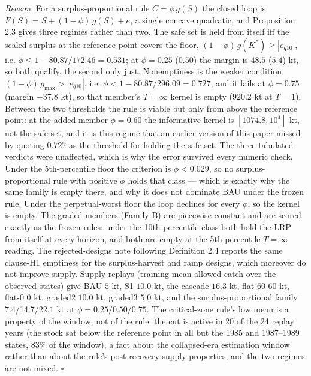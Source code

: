 \emph{Reason.} For a surplus-proportional rule \(C = \phi\, g(S)\) the
closed loop is \(F(S) = S + (1-\phi)\,g(S) + e\), a single concave
quadratic, and Proposition 2.3 gives three regimes rather than two. The
safe set is held from itself iff the scaled surplus at the reference
point covers the floor, \((1-\phi)\,g(K^*) \ge |e_{q10}|\), i.e.
\(\phi \le 1 - 80.87/172.46 = 0.531\); at \(\phi = 0.25\) (\(0.50\))
the margin is \(48.5\) (\(5.4\)) kt, so both qualify, the second only
just. Nonemptiness is the weaker condition
\((1-\phi)\,g_{\max} > |e_{q10}|\), i.e.
\(\phi < 1 - 80.87/296.09 = 0.727\), and it fails at \(\phi = 0.75\)
(margin \(-37.8\) kt), so that member's \(T=\infty\) kernel is empty
(\(920.2\) kt at \(T=1\)). Between the two thresholds the rule is
viable but only from above the reference point: at the added member
\(\phi = 0.60\) the informative kernel is \([1074.8, 10^4]\) kt, not
the safe set, and it is this regime that an earlier version of this paper
missed by quoting \(0.727\) as the threshold for holding the safe set.
The three tabulated verdicts were unaffected, which is why the error
survived every numeric check. Under the 5th-percentile floor the
criterion is \(\phi < 0.029\), so no surplus-proportional rule with
positive \(\phi\) holds that class --- which is exactly why the same
family is empty there, and why it does not dominate BAU under the frozen
rule. Under the perpetual-worst floor the
loop declines for every \(\phi\), so the kernel is empty. The graded
members (Family B) are piecewise-constant and are scored exactly as the
frozen rules: under the 10th-percentile class both hold the LRP from
itself at every horizon, and both are empty at the 5th-percentile
\(T=\infty\) reading. The rejected-designs note following Definition 2.4
reports the same clause-H1 emptiness for the surplus-harvest and ramp
designs, which moreover do not improve supply. Supply replays (training
mean allowed catch over the observed states) give BAU \(5\) kt, S1
\(10.0\) kt, the cascade \(16.3\) kt, flat-60 \(60\) kt, flat-0 \(0\)
kt, graded2 \(10.0\) kt, graded3 \(5.0\) kt, and the
surplus-proportional family \(7.4\)/14.7/\(22.1\) kt at
\(\phi = 0.25/0.50/0.75\). The critical-zone rule's low mean is a
property of the window, not of the rule: the cut is active in 20 of the
24 replay years (the stock sat below the reference point in all but the
1985 and 1987--1989 states, \(83\%\) of the window), a fact about the
collapsed-era estimation window rather than about the rule's
post-recovery supply properties, and the two regimes are not mixed. \ensuremath{\square}

